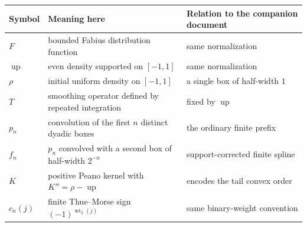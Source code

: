 \documentclass[11pt,oneside]{article}
\theoremstyle{definition}
\theoremstyle{remark}
\newcommand{\Up}{\operatorname{up}}
\newcommand{\wt}{\operatorname{wt}_2}
\begin{document}
\begin{center}
\begin{tabularx}{0.96\textwidth}{@{}p{}X X@{}}
\toprule
Symbol & Meaning here & Relation to the companion document\\
\midrule
$F$ & bounded Fabius distribution function & same normalization\\
$\Up$ & even density supported on $[-1,1]$ & same normalization\\
$\rho$ & initial uniform density on $[-1,1]$ & a single box of half-width $1$\\
$T$ & smoothing operator defined by repeated integration & fixed by $\Up$\\
$p_n$ & convolution of the first $n$ distinct dyadic boxes & the ordinary finite prefix\\
$f_n$ & $p_n$ convolved with a second box of half-width $2^{-n}$ & support-corrected finite spline\\
$K$ & positive Peano kernel with $K''=\rho-\Up$ & encodes the tail convex order\\
$c_n(j)$ & finite Thue--Morse sign $(-1)^{\wt(j)}$ & same binary-weight convention\\
\bottomrule
\end{tabularx}
\end{center}
\end{document}

